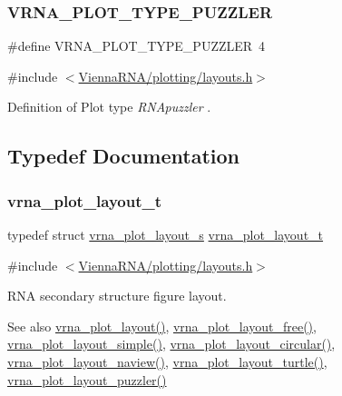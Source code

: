 \subsubsection{\texorpdfstring{VRNA\_PLOT\_TYPE\_PUZZLER}{VRNA\_PLOT\_TYPE\_PUZZLER}}
{\footnotesize\ttfamily \#define V\+R\+N\+A\+\_\+\+P\+L\+O\+T\+\_\+\+T\+Y\+P\+E\+\_\+\+P\+U\+Z\+Z\+L\+ER~4}



{\ttfamily \#include $<$\mbox{\hyperlink{layouts_8h}{Vienna\+R\+N\+A/plotting/layouts.\+h}}$>$}



Definition of Plot type {\itshape R\+N\+Apuzzler} \cite{wiegreffe:2018}. 



\subsection{Typedef Documentation}
\mbox{\label{group__plot__layout__utils_gac986fe092abc2a6a93ceb5141e4dd28b}} 
\subsubsection{\texorpdfstring{vrna\_plot\_layout\_t}{vrna\_plot\_layout\_t}}
{\footnotesize\ttfamily typedef struct \mbox{\hyperlink{group__plot__layout__utils_structvrna__plot__layout__s}{vrna\+\_\+plot\+\_\+layout\+\_\+s}} \mbox{\hyperlink{group__plot__layout__utils_gac986fe092abc2a6a93ceb5141e4dd28b}{vrna\+\_\+plot\+\_\+layout\+\_\+t}}}



{\ttfamily \#include $<$\mbox{\hyperlink{layouts_8h}{Vienna\+R\+N\+A/plotting/layouts.\+h}}$>$}



R\+NA secondary structure figure layout. 

\begin{DoxySeeAlso}{See also}
\mbox{\hyperlink{group__plot__layout__utils_ga7953b759eada86c61b0a4aebe0dc67d1}{vrna\+\_\+plot\+\_\+layout()}}, \mbox{\hyperlink{group__plot__layout__utils_ga996128730020a2d7a7368b4248195931}{vrna\+\_\+plot\+\_\+layout\+\_\+free()}}, \mbox{\hyperlink{group__plot__layout__utils_ga8b09019a429c7c2447be94901c7ed658}{vrna\+\_\+plot\+\_\+layout\+\_\+simple()}}, \mbox{\hyperlink{group__plot__layout__utils_ga41d94adbd42e1a570d840756e6dd6909}{vrna\+\_\+plot\+\_\+layout\+\_\+circular()}}, \mbox{\hyperlink{group__plot__layout__utils_gab0e886afe200db9323e4e65d44738177}{vrna\+\_\+plot\+\_\+layout\+\_\+naview()}}, \mbox{\hyperlink{group__plot__layout__utils_ga4ecd3401e22933a44bf31d14320e59b1}{vrna\+\_\+plot\+\_\+layout\+\_\+turtle()}}, \mbox{\hyperlink{group__plot__layout__utils_ga57f815d56c8c083c016381213f581f1e}{vrna\+\_\+plot\+\_\+layout\+\_\+puzzler()}} 
\end{DoxySeeAlso}


